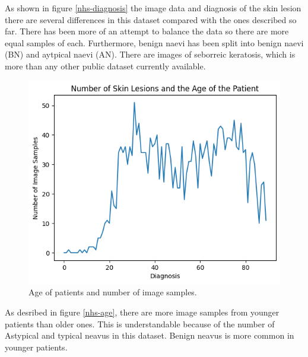  As shown in figure \ref{nhs-diagnosis} the image data and diagnosis of the skin lesion there are several differences in this dataset compared with the ones described so far. There has been more of an attempt to balance the data so there are more equal samples of each. Furthermore, benign naevi has been split into benign naevi (BN) and aytpical naevi (AN). There are images of seborreic keratosis, which is more than any other public dataset currently available. 

 \begin{figure}
	\centering
	\includegraphics[scale=0.8]{images/nhs/nhs-age.png}
	\caption{Age of patients and number of image samples.} 
\end{figure} \label{nhs-age}

As desribed in figure \ref{nhs-age}, there are more image samples from younger patients than older ones. This is understandable because of the number of Astypical and typical neavus in this dataset. Benign neavus is more common in younger patients.

